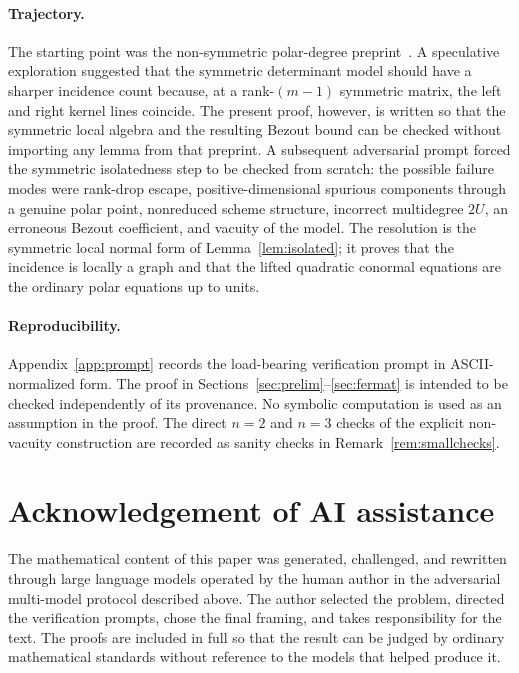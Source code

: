 \documentclass[11pt]{article}
\theoremstyle{plain}
\theoremstyle{definition}
\begin{document}
\paragraph{Trajectory.}
The starting point was the non-symmetric polar-degree preprint~\cite{SheshadriArxiv}.
A speculative exploration suggested that the symmetric determinant model should
have a sharper incidence count because, at a rank-$(m-1)$ symmetric matrix, the
left and right kernel lines coincide.  The present proof, however, is written so
that the symmetric local algebra and the resulting Bezout bound can be checked
without importing any lemma from that preprint.  A subsequent adversarial prompt forced the symmetric isolatedness step to be
checked from scratch: the possible failure modes were rank-drop escape,
positive-dimensional spurious components through a genuine polar point,
nonreduced scheme structure, incorrect multidegree $2U$, an erroneous Bezout
coefficient, and vacuity of the model.  The resolution is the symmetric local
normal form of Lemma~\ref{lem:isolated}; it proves that the incidence is locally
a graph and that the lifted quadratic conormal equations are the ordinary polar
equations up to units.

\paragraph{Reproducibility.}
Appendix~\ref{app:prompt} records the load-bearing verification prompt in
ASCII-normalized form.  The proof in Sections~\ref{sec:prelim}--\ref{sec:fermat}
is intended to be checked independently of its provenance.  No symbolic
computation is used as an assumption in the proof.  The direct $n=2$ and $n=3$
checks of the explicit non-vacuity construction are recorded as sanity checks in
Remark~\ref{rem:smallchecks}.

\section*{Acknowledgement of AI assistance}

The mathematical content of this paper was generated, challenged, and rewritten
through large language models operated by the human author in the adversarial
multi-model protocol described above.  The author selected the problem,
directed the verification prompts, chose the final framing, and takes
responsibility for the text.  The proofs are included in full so that the
result can be judged by ordinary mathematical standards without reference to the
models that helped produce it.
\end{document}

